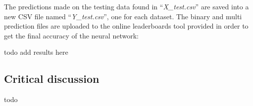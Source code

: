 \documentclass[letterpaper,12pt]{article}
\begin{document}
The predictions made on the testing data  found in ``\textit{X\_test.csv}'' are saved into a new  CSV file named ``\textit{Y\_test.csv}'', one for each  dataset. The binary and multi prediction files are uploaded to the online leaderboards tool provided  in order to get the final accuracy of the neural network:

todo add results here


\subsection{Critical discussion}

todo





\end{document}
